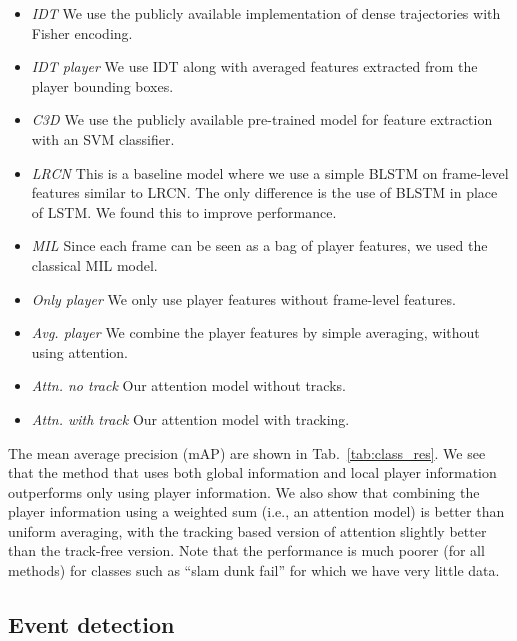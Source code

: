 \begin{itemize}
  \item \emph{IDT\cite{Wang_CVPR11}} We use the publicly available implementation of dense trajectories with
  Fisher encoding.
  
  \item \emph{IDT\cite{Wang_CVPR11} player} We use IDT along with averaged features extracted from the player
  bounding boxes.

  \item \emph{C3D \cite{Tran_arxiv14}} We use the publicly available pre-trained model for feature extraction
  with an SVM classifier.

  \item \emph{LRCN \cite{Donahue_arxiv14}} This is a baseline model where we use a simple BLSTM on frame-level features similar
  to LRCN. The only difference is the use of BLSTM in place of LSTM. We found this to improve
  performance.

  \item \emph{MIL \cite{Andrews_NIPS02}} Since each frame can be seen as a bag of player features, we used the
  classical MIL model. 

  \item \emph{Only player} We only use player features without frame-level
  features.
 
  \item \emph{Avg. player} We combine the player features by simple averaging, without
using  attention.

  \item \emph{Attn. no track} Our attention model without tracks.

  \item \emph{Attn. with track} Our attention model with tracking.
\end{itemize}

The mean average precision (mAP)
are shown in Tab.~\ref{tab:class_res}. We see that the method that
uses both global information and local player information outperforms
only using player information. We also show that combining the player
information using a weighted sum (i.e., an attention model) is better
than uniform averaging, with the tracking based version of attention
slightly better than the track-free version.
Note that the performance is much poorer (for all methods) for classes
such as ``slam dunk fail'' for which we have very little data.


\subsection{Event detection}

